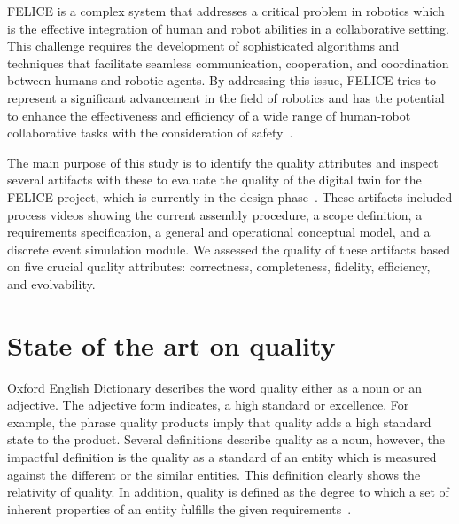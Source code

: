 \documentclass{llncs}
\begin{document}
    FELICE is a complex system that addresses a critical problem in robotics which is the effective integration of human and robot abilities in a collaborative setting. 
    This challenge requires the development of sophisticated algorithms and techniques that facilitate seamless communication, cooperation, and coordination between humans and robotic agents. 
    By addressing this issue, FELICE tries to represent a significant advancement in the field of robotics and has the potential to enhance the effectiveness and efficiency of a wide range of 
    human-robot collaborative tasks with the consideration of safety~\cite{FELICE}.

    The main purpose of this study is to identify the quality attributes and inspect several artifacts 
    with these to evaluate the quality of the digital twin for the FELICE project, 
    which is currently in the design phase~\cite{FELICE}. These artifacts included process videos showing the current 
    assembly procedure, a scope definition, a requirements specification, a general and operational conceptual model, 
    and a discrete event simulation module. We assessed the quality of these artifacts based on five crucial quality attributes: correctness, completeness, fidelity, efficiency, and evolvability.




    \section{State of the art on quality}
    Oxford English Dictionary describes the word quality either as a noun or an adjective. 
    The adjective form indicates, a high standard or excellence. For example, the phrase quality products imply 
    that quality adds a high standard state to the product. Several definitions describe quality 
    as a noun, however, the impactful definition is the quality as a standard of an entity which is measured against the 
    different or the similar entities\cite{OxfordDictionary}. This definition clearly shows the relativity of quality. In addition, quality is defined 
    as the degree to which a set of inherent properties of an entity fulfills the given requirements~\cite{ISO9000}.    
\end{document}
